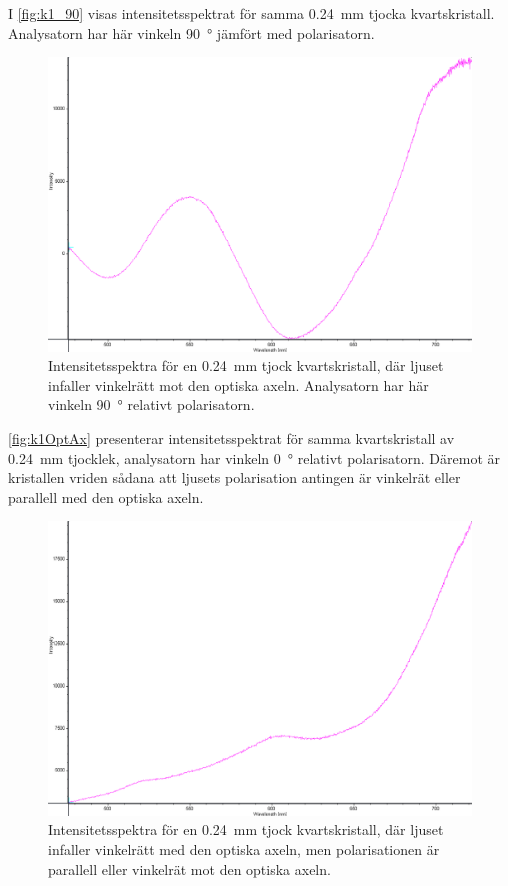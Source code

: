 \documentclass[a4paper]{article}
\begin{document}
I \autoref{fig:k1_90} visas intensitetsspektrat för samma \SI{0.24}{mm} tjocka kvartskristall. Analysatorn har här vinkeln \SI{90}{\degree} jämfört med polarisatorn.

\FloatBarrier
\begin{figure}[ht!]
	\centering
	\includegraphics[width=\linewidth]{data/spektra_180_kristall1_270_inv}
	\caption{Intensitetsspektra för en \SI{0.24}{\milli\m} tjock kvartskristall, där ljuset infaller vinkelrätt mot den optiska axeln. Analysatorn har här vinkeln \SI{+90}{\degree} relativt polarisatorn.}
	\label{fig:k1_90}
\end{figure}
\FloatBarrier

\autoref{fig:k1OptAx} presenterar intensitetsspektrat för samma kvartskristall av \SI{0.24}{mm} tjocklek, analysatorn har vinkeln \SI{0}{\degree} relativt polarisatorn. Däremot är kristallen vriden sådana att ljusets polarisation antingen är vinkelrät eller parallell med den optiska axeln.

\FloatBarrier
\begin{figure}[ht!]
	\centering
	\includegraphics[width=\linewidth]{data/spektra_kristall1_optAx_inv}
	\caption{Intensitetsspektra för en \SI{0.24}{\milli\m} tjock kvartskristall, där ljuset infaller vinkelrätt med den optiska axeln, men polarisationen är parallell eller vinkelrät mot den optiska axeln.}
	\label{fig:k1OptAx}
\end{figure}
\FloatBarrier
\end{document}
